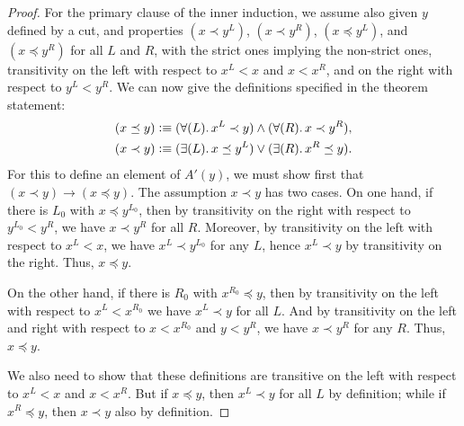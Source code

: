 \begin{proof}
  For the primary clause of the inner induction, we assume also given $y$ defined by a cut, and properties $(x\prec y^L)$, $(x\prec y^R)$, $(x\preceq y^L)$, and $(x\preceq y^R)$ for all $L$ and $R$, with the strict ones implying the non-strict ones, transitivity on the left with respect to $x^L<x$ and $x<x^R$, and on the right with respect to $y^L<y^R$.
  We can now give the definitions specified in the theorem statement:
  \begin{align}
    (x\preceq y) &\defeq
    (\fall{L} x^L\prec y) \land (\fall{R} x\prec y^R), \label{eq:NO-preceq-def}\\
    (x\prec y) &\defeq
    (\exis{L} x\preceq y^L) \lor (\exis{R} x^R \preceq y).\label{eq:NO-prec-def}
  \end{align}
  For this to define an element of $A'(y)$, we must show first that $(x\prec y) \to (x\preceq y)$.
  The assumption $x\prec y$ has two cases.
  On one hand, if there is $L_0$ with $x\preceq y^{L_0}$, then by transitivity on the right with respect to $y^{L_0}<y^R$, we have $x\prec y^R$ for all $R$.
  Moreover, by transitivity on the left with respect to $x^L<x$, we have $x^L \prec y^{L_0}$ for any $L$, hence $x^L\prec y$ by transitivity on the right.
  Thus, $x\preceq y$.

  On the other hand, if there is $R_0$ with $x^{R_0}\preceq y$, then by transitivity on the left with respect to $x^L<x^{R_0}$ we have $x^L \prec y$ for all $L$.
  And by transitivity on the left and right with respect to $x<x^{R_0}$ and $y<y^R$, we have $x\prec y^R$ for any $R$.
  Thus, $x\preceq y$.

  We also need to show that these definitions are transitive on the left with respect to $x^L<x$ and $x<x^R$.
  But if $x\preceq y$, then $x^L\prec y$ for all $L$ by definition; while if $x^R\preceq y$, then $x\prec y$ also by definition.


\end{proof}
